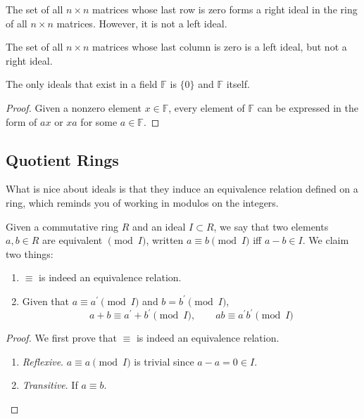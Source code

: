   \begin{example}
    The set of all $n \times n$ matrices whose last row is zero forms a right ideal in the ring of all $n \times n$ matrices. However, it is not a left ideal.

    The set of all $n\times n$ matrices whose last column is zero is a left ideal, but not a right ideal. 
  \end{example}

  \begin{theorem}
    The only ideals that exist in a field $\mathbb{F}$ is $\{0\}$ and $\mathbb{F}$ itself. 
  \end{theorem}
  \begin{proof}
    Given a nonzero element $x \in \mathbb{F}$, every element of $\mathbb{F}$ can be expressed in the form of $a x$ or $x a$ for some $a \in \mathbb{F}$. 
  \end{proof}

\subsection{Quotient Rings}

  What is nice about ideals is that they induce an equivalence relation defined on a ring, which reminds you of working in modulos on the integers. 

  \begin{theorem}
    Given a commutative ring $R$ and an ideal $I \subset R$, we say that two elements $a, b \in R$ are equivalent $\pmod{I}$, written $a \equiv b \pmod{I}$ iff $a - b \in I$. We claim two things: 
    \begin{enumerate}
      \item $\equiv$ is indeed an equivalence relation. 
      \item Given that $a \equiv a^\prime \pmod{I}$ and $b = b^\prime \pmod{I}$, 
        \begin{equation}
          a + b \equiv a^\prime + b^\prime \pmod{I}, \qquad ab \equiv a^\prime b^\prime \pmod{I}
        \end{equation}
    \end{enumerate}
  \end{theorem}
  \begin{proof}
    We first prove that $\equiv$ is indeed an equivalence relation. 
    \begin{enumerate}
      \item \textit{Reflexive}. $a \equiv a \pmod{I}$ is trivial since $a - a = 0 \in I$. 
      \item \textit{Transitive}. If $a \equiv b$. 
    \end{enumerate}
  \end{proof} 

